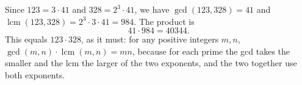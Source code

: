 Since $123=3\cdot41$ and $328=2^3\cdot41$, we have $\gcd(123,328)=41$ and $\operatorname{lcm}(123,328)=2^3\cdot3\cdot41=984$. The product is
\[41\cdot984=\boxed{40344}.\]
This equals $123\cdot328$, as it must: for any positive integers $m,n$, $\gcd(m,n)\cdot\operatorname{lcm}(m,n)=mn$, because for each prime the gcd takes the smaller and the lcm the larger of the two exponents, and the two together use both exponents.
